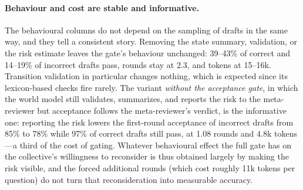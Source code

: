 \paragraph{Behaviour and cost are stable and informative.}
The behavioural columns do not depend on the sampling of drafts in the same way, and they tell a consistent story.
Removing the state summary, validation, or the risk estimate leaves the gate's behaviour unchanged: 39--43\% of correct and 14--19\% of incorrect drafts pass, rounds stay at 2.3, and tokens at 15--16k.
Transition validation in particular changes nothing, which is expected since its lexicon-based checks fire rarely.
The variant \emph{without the acceptance gate}, in which the world model still validates, summarizes, and reports the risk to the meta-reviewer but acceptance follows the meta-reviewer's verdict, is the informative one: reporting the risk lowers the first-round acceptance of incorrect drafts from 85\% to 78\% while 97\% of correct drafts still pass, at 1.08 rounds and \(4.8\)k tokens---a third of the cost of gating.
Whatever behavioural effect the full gate has on the collective's willingness to reconsider is thus obtained largely by making the risk visible, and the forced additional rounds (which cost roughly 11k tokens per question) do not turn that reconsideration into measurable accuracy.
